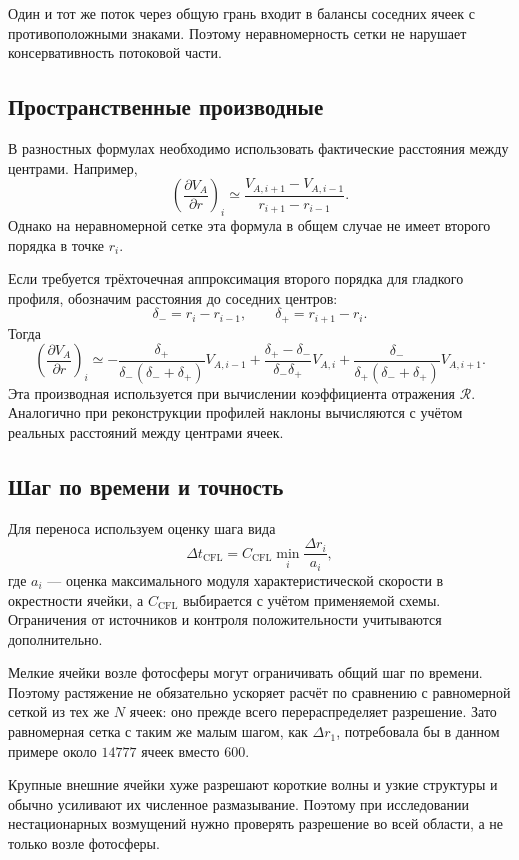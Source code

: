 \documentclass[11pt,a4paper]{article}
\begin{document}
Один и тот же поток через общую грань
входит в балансы соседних ячеек с противоположными
знаками. Поэтому неравномерность сетки
не нарушает консервативность потоковой части.

\subsection{Пространственные производные}

В разностных формулах необходимо использовать
фактические расстояния между центрами.
Например,
\[
\left(\frac{\partial V_A}{\partial r}\right)_i
\simeq
\frac{V_{A,i+1}-V_{A,i-1}}{r_{i+1}-r_{i-1}}.
\]
Однако на неравномерной сетке эта формула
в общем случае не имеет второго порядка
в точке $r_i$.

Если требуется трёхточечная аппроксимация
второго порядка для гладкого профиля,
обозначим расстояния до соседних центров:
\[
\delta_-=r_i-r_{i-1},
\qquad
\delta_+=r_{i+1}-r_i.
\]
Тогда
\[
\left(\frac{\partial V_A}{\partial r}\right)_i
\simeq
-\frac{\delta_+}{\delta_-(\delta_-+\delta_+)}V_{A,i-1}
+\frac{\delta_+-\delta_-}{\delta_-\delta_+}V_{A,i}
+\frac{\delta_-}{\delta_+(\delta_-+\delta_+)}V_{A,i+1}.
\]
Эта производная используется при вычислении
коэффициента отражения $\mathcal R$.
Аналогично при реконструкции профилей
наклоны вычисляются с учётом реальных расстояний
между центрами ячеек.

\subsection{Шаг по времени и точность}

Для переноса используем оценку шага вида
\[
\Delta t_{\mathrm{CFL}}
=
C_{\mathrm{CFL}}
\min_i\frac{\Delta r_i}{a_i},
\]
где $a_i$ --- оценка максимального модуля
характеристической скорости в окрестности ячейки,
а $C_{\mathrm{CFL}}$ выбирается с учётом
применяемой схемы.
Ограничения от источников и контроля положительности
учитываются дополнительно.

Мелкие ячейки возле фотосферы могут ограничивать
общий шаг по времени.
Поэтому растяжение не обязательно ускоряет расчёт
по сравнению с равномерной сеткой из тех же $N$ ячеек:
оно прежде всего перераспределяет разрешение.
Зато равномерная сетка с таким же малым шагом,
как $\Delta r_1$, потребовала бы в данном примере
около $14777$ ячеек вместо $600$.

Крупные внешние ячейки хуже разрешают короткие волны
и узкие структуры и обычно усиливают их численное
размазывание. Поэтому при исследовании нестационарных
возмущений нужно проверять разрешение
во всей области, а не только возле фотосферы.
\end{document}
